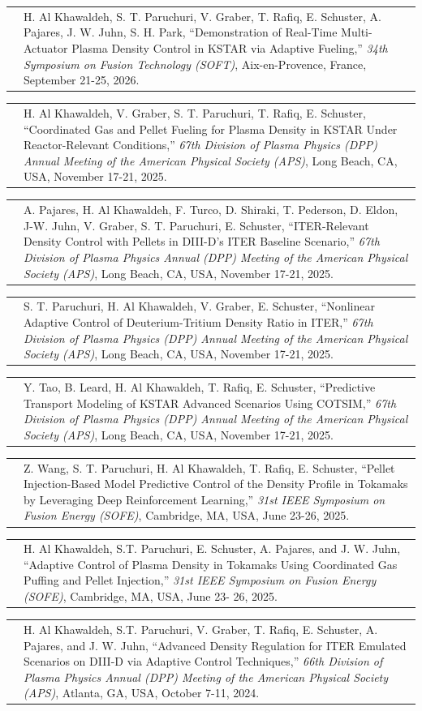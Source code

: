\documentclass[11pt,letterpaper]{article}
\makeatletter
\newcommand{\CVItem}[2]{%
  \begin{tabularx}{\textwidth}{@{}p{0.83in}@{\hspace{0.15in}}X@{}}
    \raggedleft{#1} & #2\\[3pt]
  \end{tabularx}
}
\makeatother
\begin{document}
\CVItem{[1]}{H. Al Khawaldeh, S. T. Paruchuri, V. Graber, T. Rafiq, E. Schuster, A. Pajares, J. W. Juhn, S. H. Park, ``Demonstration of Real-Time Multi-Actuator Plasma Density Control in KSTAR via Adaptive Fueling,'' \textit{34th Symposium on Fusion Technology (SOFT)}, Aix-en-Provence, France, September 21-25, 2026.}

\CVItem{[2]}{H. Al Khawaldeh, V. Graber, S. T. Paruchuri, T. Rafiq, E. Schuster, ``Coordinated Gas and Pellet Fueling for Plasma Density in KSTAR Under Reactor-Relevant Conditions,'' \textit{67th Division of Plasma Physics (DPP) Annual Meeting of the American Physical Society (APS)}, Long Beach, CA, USA, November 17-21, 2025.} 

\CVItem{[3]}{A. Pajares, H. Al Khawaldeh, F. Turco, D. Shiraki, T. Pederson, D. Eldon, J-W. Juhn, V. Graber, S. T. Paruchuri, E. Schuster, ``ITER-Relevant Density Control with Pellets in DIII-D’s ITER Baseline Scenario,'' \textit{67th Division of Plasma Physics Annual (DPP) Meeting of the American Physical Society (APS)}, Long Beach, CA, USA, November 17-21, 2025.}

\CVItem{[4]}{S. T. Paruchuri, H. Al Khawaldeh, V. Graber, E. Schuster, ``Nonlinear Adaptive Control of Deuterium-Tritium Density Ratio in ITER,'' \textit{67th Division of Plasma Physics (DPP) Annual Meeting of the American Physical Society (APS)}, Long Beach, CA, USA, November 17-21, 2025.}

\CVItem{[5]}{Y. Tao, B. Leard, H. Al Khawaldeh, T. Rafiq, E. Schuster, ``Predictive Transport Modeling of KSTAR Advanced Scenarios Using COTSIM,'' \textit{67th Division of Plasma Physics (DPP) Annual Meeting of the American Physical Society (APS)}, Long Beach, CA, USA, November 17-21, 2025.}

\CVItem{[6]}{Z. Wang, S. T. Paruchuri, H. Al Khawaldeh, T. Rafiq, E. Schuster, ``Pellet Injection-Based Model Predictive Control of the Density Profile in Tokamaks by Leveraging Deep Reinforcement Learning,'' \textit{31st IEEE Symposium on Fusion Energy (SOFE)}, Cambridge, MA, USA, June 23-26, 2025.}

\CVItem{[7]}{H. Al Khawaldeh, S.T. Paruchuri, E. Schuster, A. Pajares, and J. W. Juhn, ``Adaptive Control of Plasma Density in Tokamaks Using Coordinated Gas Puffing and Pellet Injection,'' \textit{31st IEEE Symposium on Fusion Energy (SOFE)}, Cambridge, MA, USA, June 23- 26, 2025.}

\CVItem{[8]}{H. Al Khawaldeh, S.T. Paruchuri, V. Graber, T. Rafiq, E. Schuster, A. Pajares, and J. W. Juhn, ``Advanced Density Regulation for ITER Emulated Scenarios on DIII-D via Adaptive Control Techniques,'' \textit{66th Division of Plasma Physics Annual (DPP) Meeting of the American Physical Society (APS)}, Atlanta, GA, USA, October 7-11, 2024.}
\end{document}
